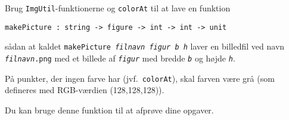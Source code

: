 Brug \texttt{ImgUtil}-funktionerne og \texttt{colorAt} til at lave en
funktion

\vspace{-4mm}
\begin{verbatim}
makePicture : string -> figure -> int -> int -> unit
\end{verbatim}
\vspace{-4mm}

\noindent
sådan at kaldet \texttt{makePicture \emph{filnavn figur b h}} laver en
billedfil ved navn \texttt{\emph{filnavn}.png} med et billede
af \texttt{\emph{figur}} med bredde \texttt{\emph{b}} og
højde \texttt{\emph{h}}.

På punkter, der ingen farve har (jvf.\ \texttt{colorAt}), skal farven
være grå (som defineres med RGB-værdien (128,128,128)).

Du kan bruge denne funktion til at afprøve dine opgaver.
